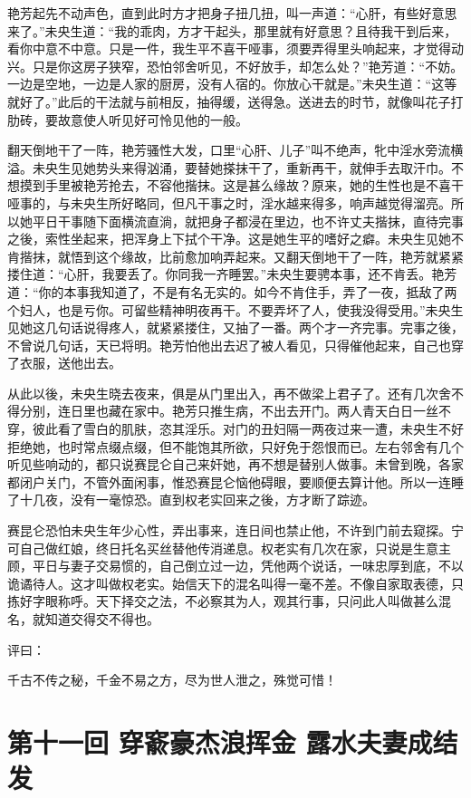 \documentclass[a4paper,12pt,UTF8,twoside]{ctexbook}
\begin{document}
艳芳起先不动声色，直到此时方才把身子扭几扭，叫一声道：“心肝，有些好意思来了。”未央生道：“我的乖肉，方才干起头，那里就有好意思？且待我干到后来，看你中意不中意。只是一件，我生平不喜干哑事，须要弄得里头响起来，才觉得动兴。只是你这房子狭窄，恐怕邻舍听见，不好放手，却怎么处？”艳芳道：“不妨。一边是空地，一边是人家的厨房，没有人宿的。你放心干就是。”未央生道：“这等就好了。”此后的干法就与前相反，抽得缓，送得急。送进去的时节，就像叫花子打肋砖，要故意使人听见好可怜见他的一般。

翻天倒地干了一阵，艳芳骚性大发，口里“心肝、儿子”叫不绝声，牝中淫水旁流横溢。未央生见她势头来得汹涌，要替她搽抹干了，重新再干，就伸手去取汗巾。不想摸到手里被艳芳抢去，不容他揩抹。这是甚么缘故？原来，她的生性也是不喜干哑事的，与未央生所好略同，但凡干事之时，淫水越来得多，响声越觉得溜亮。所以她平日干事随下面横流直淌，就把身子都浸在里边，也不许丈夫揩抹，直待完事之後，索性坐起来，把浑身上下拭个干净。这是她生平的嗜好之癖。未央生见她不肯揩抹，就悟到这个缘故，比前愈加响弄起来。又翻天倒地干了一阵，艳芳就紧紧搂住道：“心肝，我要丢了。你同我一齐睡罢。”未央生要骋本事，还不肯丢。艳芳道：“你的本事我知道了，不是有名无实的。如今不肯住手，弄了一夜，抵敌了两个妇人，也是亏你。可留些精神明夜再干。不要弄坏了人，使我没得受用。”未央生见她这几句话说得疼人，就紧紧搂住，又抽了一番。两个才一齐完事。完事之後，不曾说几句话，天已将明。艳芳怕他出去迟了被人看见，只得催他起来，自己也穿了衣服，送他出去。

从此以後，未央生晓去夜来，俱是从门里出入，再不做梁上君子了。还有几次舍不得分别，连日里也藏在家中。艳芳只推生病，不出去开门。两人青天白日一丝不穿，彼此看了雪白的肌肤，恣其淫乐。对门的丑妇隔一两夜过来一遭，未央生不好拒绝她，也时常点缀点缀，但不能饱其所欲，只好免于怨恨而已。左右邻舍有几个听见些响动的，都只说赛昆仑自己来奸她，再不想是替别人做事。未曾到晚，各家都闭户关门，不管外面闲事，惟恐赛昆仑恼他碍眼，要顺便去算计他。所以一连睡了十几夜，没有一毫惊恐。直到权老实回来之後，方才断了踪迹。

赛昆仑恐怕未央生年少心性，弄出事来，连日间也禁止他，不许到门前去窥探。宁可自己做红娘，终日托名买丝替他传消递息。权老实有几次在家，只说是生意主顾，平日与妻子交易惯的，自己倒立过一边，凭他两个说话，一味忠厚到底，不以诡谲待人。这才叫做权老实。始信天下的混名叫得一毫不差。不像自家取表德，只拣好字眼称呼。天下择交之法，不必察其为人，观其行事，只问此人叫做甚么混名，就知道交得交不得也。

评曰：

千古不传之秘，千金不易之方，尽为世人泄之，殊觉可惜！

\chapter{第十一回 穿窬豪杰浪挥金 露水夫妻成结发}
\end{document}
